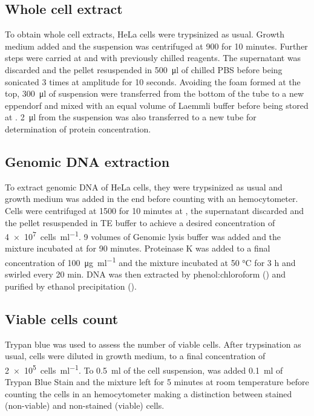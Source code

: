   \subsection{Whole cell extract}
    \label{sec:cell-extract}
    To obtain whole cell extracts, HeLa cells were trypsinized as usual. Growth
    medium added and the suspension was centrifuged at \SI{900}{\gn} for 10 minutes. Further
    steps were carried at  and with previously chilled reagents. The supernatant
    was discarded and the pellet resuspended in \SI{500}{\ul} of chilled PBS before being
    sonicated 3 times at  amplitude for 10 seconds. Avoiding the foam formed at
    the top, \SI{300}{\ul} of suspension were transferred from the bottom of the tube to a
    new eppendorf and mixed with an equal volume of Laemmli buffer before being
    stored at . \SI{2}{\ul} from the suspension was also transferred to a new tube
    for determination of protein concentration.

  \subsection{Genomic DNA extraction}
    To extract genomic DNA of HeLa cells, they were trypsinized as usual and
    growth medium was added in the end before counting with an hemocytometer.
    Cells were centrifuged at \SI{1500}{\gn} for 10 minutes at , the supernatant discarded
    and the pellet resuspended in TE buffer to achieve a desired concentration of
    \SI{4e7}{cells\per\ml}. 9 volumes of Genomic lysis buffer was added and the mixture
    incubated at  for 90 minutes. Proteinase K was added to a final concentration of
    \SI{100}{\ug\per\ml} and the mixture incubated at 50 °C for 3 h and swirled every 20 min.
    DNA was then extracted by phenol:chloroform () and purified by ethanol
    precipitation ().

  \subsection{Viable cells count}
    Trypan blue was used to assess the number of viable cells. After trypsination
    as usual, cells were diluted in growth medium, to a final concentration of \SI{2e5}{cells\per\ml}.
    To \SI{0.5}{\ml} of the cell suspension, was added \SI{0.1}{\ml} of  Trypan
    Blue Stain and the mixture left for 5 minutes at room temperature before counting
    the cells in an hemocytometer making a distinction between stained (non-viable)
    and non-stained (viable) cells.

